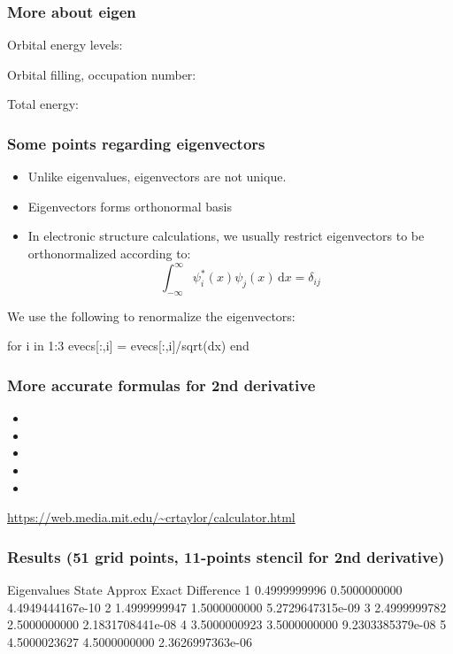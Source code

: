 \begin{frame}
\frametitle{More about eigen}

Orbital energy levels:

Orbital filling, occupation number:

Total energy:

\end{frame}


\begin{frame}[fragile]
\frametitle{Some points regarding eigenvectors}

\begin{itemize}
\item Unlike eigenvalues, eigenvectors are not unique.
\item Eigenvectors forms orthonormal basis
\item In electronic structure calculations, we usually restrict eigenvectors to be
orthonormalized according to:
\begin{equation*}
\int_{-\infty}^{\infty} \psi^{*}_{i}(x) \psi_{j}(x) \, \mathrm{d}x = \delta_{ij}
\end{equation*}
\end{itemize}
We use the following to renormalize the eigenvectors:
\begin{juliacode}
for i in 1:3
    evecs[:,i] = evecs[:,i]/sqrt(dx)
end
\end{juliacode}

\end{frame}


\begin{frame}[fragile]
\frametitle{More accurate formulas for 2nd derivative}

\begin{itemize}
\item {}
\item {}
\item {}
\item {}
\item {}
\end{itemize}

{\footnotesize \url{https://web.media.mit.edu/~crtaylor/calculator.html}}

\end{frame}


\begin{frame}[fragile]
\frametitle{Results (51 grid points, 11-points stencil for 2nd derivative)}

\begin{textcode}
Eigenvalues
State         Approx              Exact          Difference
   1       0.4999999996       0.5000000000   4.4949444167e-10
   2       1.4999999947       1.5000000000   5.2729647315e-09
   3       2.4999999782       2.5000000000   2.1831708441e-08
   4       3.5000000923       3.5000000000   9.2303385379e-08
   5       4.5000023627       4.5000000000   2.3626997363e-06
\end{textcode}

\end{frame}


